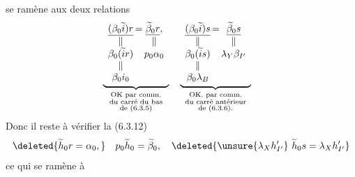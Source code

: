 se ramène aux deux relations
\[
\begin{aligned}
&\underbrace{\begin{array}[t]{c@{\,}c@{\,}c}
 \underline{(\beta_0\widetilde i)r}&=&\underline{\widetilde\beta_0r},\\
 \Vert&&\Vert\\
 \beta_0(\widetilde i r)&&p_0\alpha_0\\
 \Vert&&\\
 \beta_0i_0&&
\end{array}}_{\substack{\text{OK par comm.}\\\text{du carré du bas}\\\text{de (6.3.5)}}}
\quad
\underbrace{\begin{array}[t]{c@{\,}c@{\,}c}
 \underline{(\beta_0\widetilde i)s}&=&\underline{\widetilde\beta_0s}\\
 \Vert&&\Vert\\
 \beta_0(\widetilde i s)&&\lambda_Y\beta_{I'}\\
 \Vert&&\\
 \beta_0\lambda_B&&
\end{array}}_{\substack{\text{OK. par comm.}\\\text{du carré antérieur}\\\text{de (6.3.6).}}}
\end{aligned}
\]
Donc il reste à vérifier  la   (6.3.12)
\[
 \deleted{\widetilde h_0 r=\alpha_0,}\quad
 p_0\widetilde h_0=\widetilde\beta_0,\quad
 \deleted{\unsure{\lambda_X h'_{I'}}\ \widetilde h_0 s=\lambda_X h'_{I'}}
\]
ce qui se ramène à
